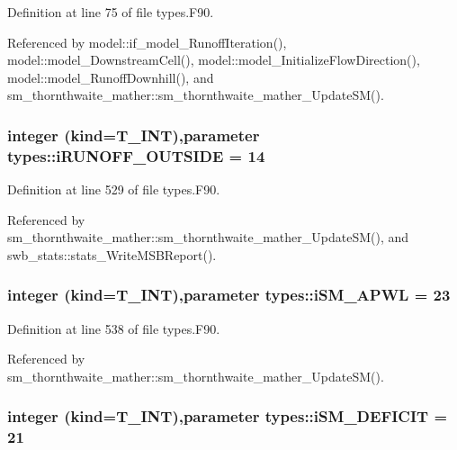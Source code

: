 Definition at line 75 of file types.F90.



Referenced by model::if\_\-model\_\-RunoffIteration(), model::model\_\-DownstreamCell(), model::model\_\-InitializeFlowDirection(), model::model\_\-RunoffDownhill(), and sm\_\-thornthwaite\_\-mather::sm\_\-thornthwaite\_\-mather\_\-UpdateSM().

\hypertarget{namespacetypes_aab5c72102086046b4f2dbaab08ccb75b}{
\subsubsection[{iRUNOFF\_\-OUTSIDE}]{\setlength{\rightskip}{0pt plus 5cm}integer (kind={\bf T\_\-INT}),parameter {\bf types::iRUNOFF\_\-OUTSIDE} = 14}}
\label{namespacetypes_aab5c72102086046b4f2dbaab08ccb75b}


Definition at line 529 of file types.F90.



Referenced by sm\_\-thornthwaite\_\-mather::sm\_\-thornthwaite\_\-mather\_\-UpdateSM(), and swb\_\-stats::stats\_\-WriteMSBReport().

\hypertarget{namespacetypes_a65e055348b61912a3790d7b3f4c9bf0a}{
\subsubsection[{iSM\_\-APWL}]{\setlength{\rightskip}{0pt plus 5cm}integer (kind={\bf T\_\-INT}),parameter {\bf types::iSM\_\-APWL} = 23}}
\label{namespacetypes_a65e055348b61912a3790d7b3f4c9bf0a}


Definition at line 538 of file types.F90.



Referenced by sm\_\-thornthwaite\_\-mather::sm\_\-thornthwaite\_\-mather\_\-UpdateSM().

\hypertarget{namespacetypes_a87837f70eb7d1089df9cb4595c0f7811}{
\subsubsection[{iSM\_\-DEFICIT}]{\setlength{\rightskip}{0pt plus 5cm}integer (kind={\bf T\_\-INT}),parameter {\bf types::iSM\_\-DEFICIT} = 21}}
\label{namespacetypes_a87837f70eb7d1089df9cb4595c0f7811}


